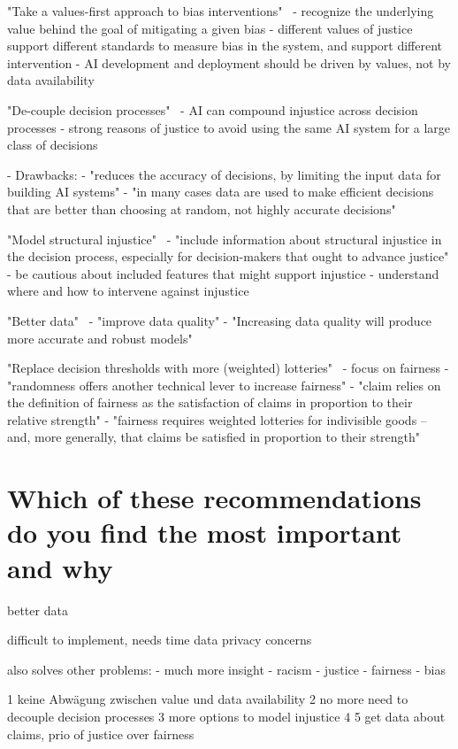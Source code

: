 "Take a values-first approach to bias interventions"~\parencite[][20]{vredenburgh}
- recognize the underlying value behind the goal of mitigating a given bias
- different values of justice support different standards to measure bias in the system, and support different intervention
- AI development and deployment should be driven by values, not by data availability

"De-couple decision processes"~\parencite[][22]{vredenburgh}
- AI can compound injustice across decision processes
- strong reasons of justice to avoid using the same AI system for a large class of decisions

- Drawbacks:
  - "reduces the accuracy of decisions, by limiting the input data for building AI systems"
  - "in many cases data are used to make efficient decisions that are better than choosing at random, not highly accurate decisions"

"Model structural injustice"~\parencite[][23]{vredenburgh}
- "include information about structural injustice in the decision process, especially for decision-makers that ought to advance justice"
- be cautious about included features that might support injustice
- understand where and how to intervene against injustice

"Better data"~\parencite[][24]{vredenburgh}
- "improve data quality"
- "Increasing data quality will produce more accurate and robust models"

"Replace decision thresholds with more (weighted) lotteries"~\parencite[][24]{vredenburgh}
- focus on fairness
- "randomness offers another technical lever to increase fairness"
- "claim relies on the definition of fairness as the satisfaction of claims in proportion to their relative strength"
- "fairness requires weighted lotteries for indivisible goods – and, more generally, that claims be satisfied in proportion to their strength"


\section*{Which of these recommendations do you find the most important and why}

better data


difficult to implement, needs time
data privacy concerns


also solves other problems:
- much more insight
  - racism
  - justice
  - fairness
  - bias


1 keine Abwägung zwischen value und data availability
2 no more need to decouple decision processes
3 more options to model injustice
4
5 get data about claims, prio of justice over fairness




